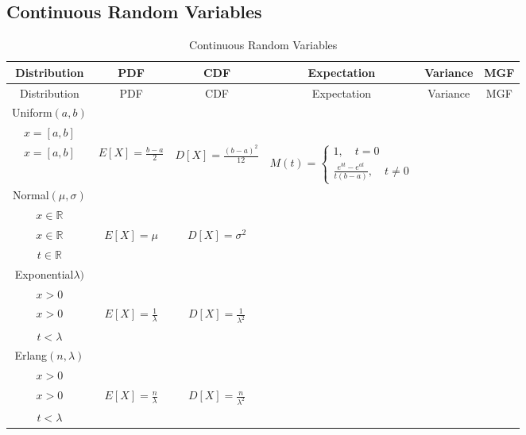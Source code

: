 \begin{landscape}
		\section{Continuous Random Variables}
			\begin{longtable}[c]{|c|c|c|c|c|c|}
				\caption{Continuous Random Variables \label{CRV}}\\
				\hline
				Distribution & PDF & CDF & Expectation & Variance & MGF \\
				\hline
				\endfirsthead
				\hline
				Distribution & PDF & CDF & Expectation & Variance & MGF \\
				\hline
				\endhead
				Uniform$(a, b)$ & 
				\makecell{$f(x)=\frac1{b-a}$ \\ $x=[a,b]$} & 
				\makecell{$F(x)=\frac{x-a}{b-a}$ \\ $x=[a,b]$} & 
				$E[X]=\frac{b-a}{2}$ & 
				$D[X]=\frac{(b-a)^2}{12}$ & 
				$M(t)=\begin{cases}1, \quad t=0 \\ \frac{e^{bt}-e^{at}}{t(b-a)}, \quad t\ne 0\end{cases}$\\
				\hline
				Normal$(\mu, \sigma)$ &
				\makecell{$f(x)=\frac{1}{\sqrt{2\pi}\sigma}e^{-\frac{(x-\mu)^2}{2\sigma^2}}$ \\ $x\in \mathbb{R}$} &
				\makecell{$F(x)=\int_{-\infty}^{x}\frac{1}{\sqrt{2\pi}\sigma}e^{-\frac{(x-\mu)^2}{2\sigma^2}}$ \\ $x\in \mathbb{R}$} &
				$E[X]=\mu$ &
				$D[X]=\sigma^2$ &
				\makecell{$e^{\frac{t(t\sigma^2+2\mu)}{2}}$ \\ $t\in \mathbb{R}$}\\
				\hline
				Exponential$\lambda)$ &
				\makecell{$f(x)=\lambda e^{-\lambda x}$ \\ $x>0$} &
				\makecell{$F(x)=1-e^{\lambda x}$ \\ $x>0$} &
				$E[X]=\frac{1}{\lambda}$ &
				$D[X]=\frac{1}{\lambda^2}$ &
				\makecell{$\frac{1}{1-\frac{t}{\lambda}}$ \\ $t<\lambda$}\\
				\hline
				Erlang$(n, \lambda)$ &
				\makecell{$f(x)=\frac{\lambda^n x^{n-1} e^{-\lambda x}}{(n-1)!}$ \\ $x>0$} &
				\makecell{$F(x)=1-\sum_{i=0}^{n-1}\frac{\lambda^n x^n e^{-\lambda x}}{n!}$ \\ $x>0$} &
				$E[X]=\frac{n}{\lambda}$ &
				$D[X]=\frac{n}{\lambda^2}$ &
				\makecell{$\frac{1}{(1-\frac{t}{\lambda})^n}$ \\ $t<\lambda$} \\
				\hline
			\end{longtable} 
		\end{landscape}

